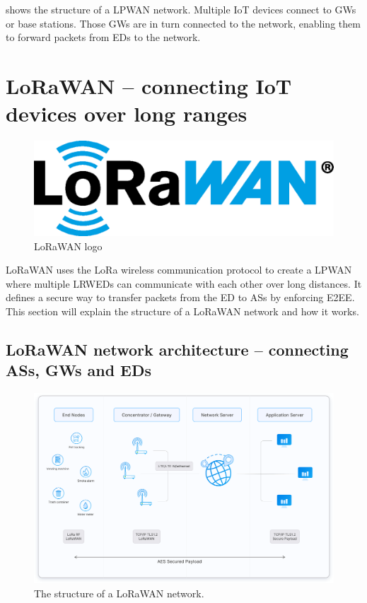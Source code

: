  shows the structure of a \ac{LPWAN} network.
Multiple \ac{IoT} devices connect to \aclp{GW} or base stations.
Those \aclp{GW} are in turn connected to the network, enabling them to forward packets from \aclp{ED} to the network.

\section{\acl{LoRaWAN} – connecting \acl{IoT} devices over long ranges}\label{sec:lorawan}

\begin{figure}[htbp]
    \centering
    \includegraphics[width=.3\textwidth]{pictures/logos/LoRaWAN_Logo.eps}
    \caption[\ac{LoRaWAN} logo]{
        \ac{LoRaWAN} logo~\protect\cite{lora_alliance_francais_2022}
    }
\end{figure}

\ac{LoRaWAN} uses the \ac{LoRa} wireless communication protocol to create a \ac{LPWAN} where multiple \aclp{LRWED} can communicate with each other over long distances.
It defines a secure way to transfer packets from the \acl{ED} to \acp{AS} by enforcing \ac{E2EE}.
This section will explain the structure of a \ac{LoRaWAN} network and how it works.

\subsection{\acs{LoRaWAN} network architecture – connecting \aclp{AS}, \aclp{GW} and \aclp{ED}}

\begin{figure}[htbp]
    \centering
    \includegraphics[width=1\textwidth]{pictures/lorawan-structure/lorawan-architecture.png}
    \caption[Structure of a \ac{LoRaWAN} network]{
        The structure of a \ac{LoRaWAN} network.~\protect\cite{the_things_industries_bv_lorawan_nodate}
    }\label{pic:lorawan-network-structure}
\end{figure}

